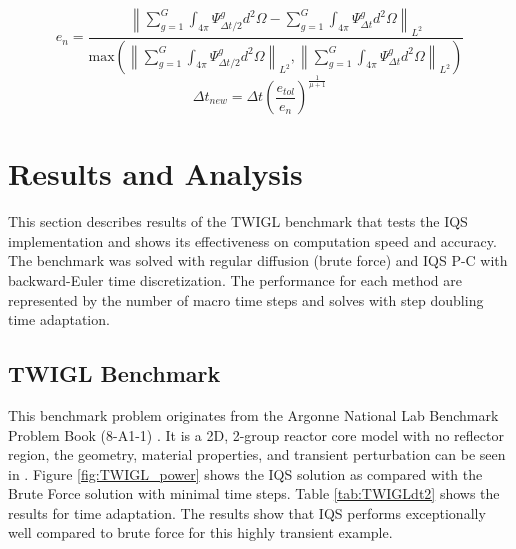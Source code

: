 \documentclass{anstrans}
\newcommand{\be}{\begin{equation}}
\newcommand{\ee}{\end{equation}}
\newcommand{\norm}[1]{\left\lVert#1\right\rVert_{L^2}}
\begin{document}
\be
e_n = \frac{\norm{\sum_{g=1}^G\int_{4\pi}\Psi^g_{\Delta t/2} d^2\Omega - \sum_{g=1}^G\int_{4\pi}\Psi^g_{\Delta t} d^2\Omega}}{\text{max}\left(\norm{\sum_{g=1}^G\int_{4\pi}\Psi^g_{\Delta t/2} d^2\Omega},\norm{\sum_{g=1}^G \int_{4\pi}\Psi^g_{\Delta t} d^2\Omega}\right)}
\label{eq:edt2}
\ee
\be
\Delta t_{new} = \Delta t \left(\frac{e_{tol}}{e_n}\right)^{\frac{1}{\mu+1}}
\label{eq:dt2}
\ee 

\section{Results and Analysis}
This section describes results of the TWIGL benchmark that tests the IQS implementation and shows its effectiveness on computation speed and accuracy.  The benchmark was solved with regular diffusion (brute force) and IQS P-C with backward-Euler time discretization.  The performance for each method are represented by the number of macro time steps and solves with step doubling time adaptation.

\subsection{TWIGL Benchmark}

This benchmark problem originates from the Argonne National Lab Benchmark Problem Book (8-A1-1) \cite{ANL_BPB}.  It is a 2D, 2-group reactor core model with no reflector region, the geometry, material properties, and transient perturbation can be seen in \cite{TWIGL_benchmark}. Figure \ref{fig:TWIGL_power} shows the IQS  solution as compared with the Brute Force solution with minimal time steps.  Table \ref{tab:TWIGLdt2} shows the results for time adaptation.  The results show that IQS performs exceptionally well compared to brute force for this highly transient example.
\end{document}
